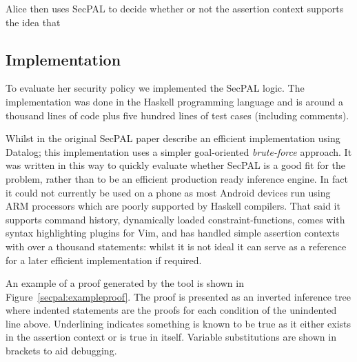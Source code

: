 \documentclass[a4paper,12pt,sfsidenotes]{tufte-book}
\begin{document}
Alice then uses SecPAL to decide whether or not the assertion context supports
the idea that 

\subsection{Implementation}

To evaluate her security policy we implemented the SecPAL logic.
The implementation was done in the Haskell programming language and is around a
thousand lines of code plus five hundred lines of test cases (including
comments).

Whilst in the original SecPAL paper\cite{Becker:2010vh}
\citeauthor*{Becker:2010vh} describe an efficient implementation using Datalog;
this implementation uses a simpler goal-oriented \emph{brute-force} approach.
It was written in this way to quickly evaluate whether SecPAL is a good fit for
the problem, rather than to be an efficient production ready inference
engine.  In fact it could not currently be used on a phone as most Android devices
run using ARM processors which are poorly supported by Haskell compilers.
That said it supports command history, dynamically loaded constraint-functions,
comes with syntax highlighting plugins for Vim, and has handled simple assertion
contexts with over a thousand statements: whilst it is not ideal it can serve as
a reference for a later efficient implementation if required.

An example of a proof generated by the tool is shown in
Figure~\ref{secpal:exampleproof}.  The proof is presented as an inverted
inference tree where indented statements are the proofs for each condition of
the unindented line above.  Underlining indicates something is known to be true
as it either exists in the assertion context or is true in itself. Variable
substitutions are shown in brackets to aid debugging.
\end{document}
